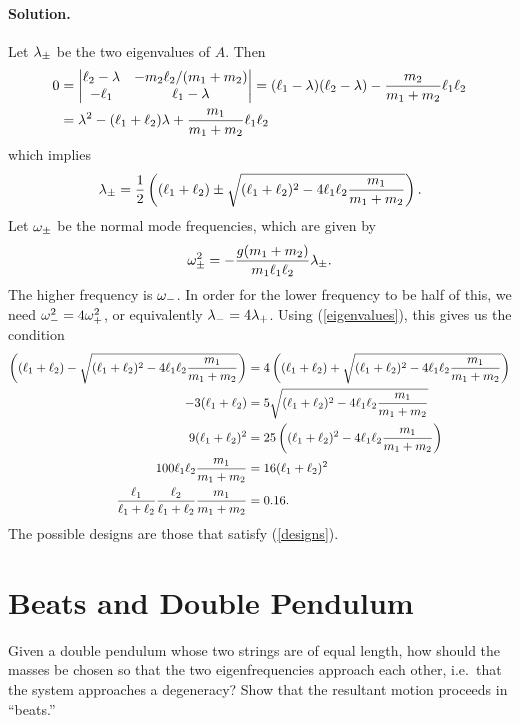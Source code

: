 \documentclass[11pt]{article}
\newcommand{\refeq}[1]{(\ref{#1})}
\newenvironment{statement}
{
    \color{darkgray}
    \ignorespaces
}
{
    \smallskip
}
\newenvironment{solution}
{
    \paragraph{Solution.}
    \ignorespaces
}
{
    \bigskip
}
\begin{document}
\begin{solution}
	Let $\lambda_\pm$ be the two eigenvalues of $A$.  Then
	\begin{align}
		0 &= \mdet{\elw - \lambda & -\mw \elw / (\mq + \mw) \\ -\elq & \elq - \lambda} = (\elq - \lambda) (\elw - \lambda) - \frac{\mw}{\mq + \mw} \elq \elw \\
		&= \lambda^2 - (\elq + \elw) \lambda + \frac{\mq}{\mq + \mw} \elq \elw
	\end{align}
	which implies
	\begin{equation} \label{eigenvalues}
		\lambda_\pm = \frac{1}{2} \left( (\ell_1 + \ell_2) \pm \sqrt{(\ell_1 + \ell_2)^2 - 4 \ell_1 \ell_2 \frac{m_1}{m_1 + m_2}} \right).
	\end{equation}
	Let $\omega_\pm$ be the normal mode frequencies, which are given by
	\begin{equation}
		\omega_\pm^2 = -\frac{g (m_1 + m_2)}{m_1 \ell_1 \ell_2} \lambda_\pm.
	\end{equation}
	The higher frequency is $\omega_-$.  In order for the lower frequency to be half of this, we need $\omega_-^2 = 4 \omega_+^2$, or equivalently $\lambda_- = 4 \lambda_+$.  Using \refeq{eigenvalues}, this gives us the condition
	\begin{align}
		\left( (\ell_1 + \ell_2) - \sqrt{(\ell_1 + \ell_2)^2 - 4 \ell_1 \ell_2 \frac{m_1}{m_1 + m_2}} \right) &= 4 \left( (\ell_1 + \ell_2) + \sqrt{(\ell_1 + \ell_2)^2 - 4 \ell_1 \ell_2 \frac{m_1}{m_1 + m_2}} \right) \\
		-3 (\ell_1 + \ell_2) &= 5 \sqrt{(\ell_1 + \ell_2)^2 - 4 \ell_1 \ell_2 \frac{m_1}{m_1 + m_2}} \\
		9 (\ell_1 + \ell_2)^2 &= 25 \left( (\ell_1 + \ell_2)^2 - 4 \ell_1 \ell_2 \frac{m_1}{m_1 + m_2} \right) \\
		100 \ell_1 \ell_2 \frac{m_1}{m_1 + m_2} &= 16 (\ell_1 + \ell_2)^2 \\
		\frac{\ell_1}{\ell_1 + \ell_2} \frac{\ell_2}{\ell_1 + \ell_2} \frac{m_1}{m_1 + m_2} &= 0.16. \label{designs}
	\end{align}
	The possible designs are those that satisfy \refeq{designs}.
\end{solution}


\section{Beats and Double Pendulum}
\begin{statement}
	Given a double pendulum whose two strings are of equal length, how should the masses be chosen so that the two eigenfrequencies approach each other, i.e.~that the system approaches a degeneracy?  Show that the resultant motion proceeds in ``beats.''
\end{statement}
\end{document}
